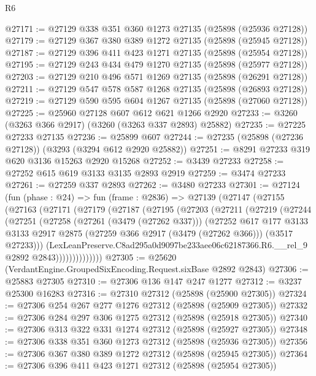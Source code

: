 \begin{lexlean}{R6}
\begin{coremodule}
@27171 := @27129 @338 @351 @360 @1273 @27135 (@25898 (@25936 @27128))
@27179 := @27129 @367 @380 @389 @1272 @27135 (@25898 (@25945 @27128))
@27187 := @27129 @396 @411 @423 @1271 @27135 (@25898 (@25954 @27128))
@27195 := @27129 @243 @434 @479 @1270 @27135 (@25898 (@25977 @27128))
@27203 := @27129 @210 @496 @571 @1269 @27135 (@25898 (@26291 @27128))
@27211 := @27129 @547 @578 @587 @1268 @27135 (@25898 (@26893 @27128))
@27219 := @27129 @590 @595 @604 @1267 @27135 (@25898 (@27060 @27128))
@27225 := @25960 @27128 @607 @612 @621 @1266 @2920
@27233 := @3260 (@3263 @366 @2917) (@3260 (@3263 @337 @2893) @25882)
@27235 := @27225 @27233 @27135
@27236 := @25899 @607
@27244 := @27235 (@25898 (@27236 @27128)) (@3293 (@3294 @612 @2920 @25882))
@27251 := @8291 @27233 @319 @620 @3136 @15263 @2920 @15268
@27252 := @3439 @27233
@27258 := @27252 @615 @619 @3133 @3135 @2893 @2919
@27259 := @3474 @27233
@27261 := @27259 @337 @2893
@27262 := @3480 @27233
@27301 := @27124
    (fun (phase : @24) =>
    fun (frame : @2836) =>
    @27139
      (@27147
        (@27155
          (@27163
            (@27171
              (@27179
                (@27187
                  (@27195
                    (@27203
                      (@27211
                        (@27219
                          (@27244
                            (@27251
                              (@27258
                                (@27261 (@3479 (@27262 @337)))
                                (@27252
                                  @617
                                  @177
                                  @3133
                                  @3133
                                  @2917
                                  @2875
                                  (@27259 @366 @2917 (@3479 (@27262 @366)))
                                  (@3517 @27233)))
                              (LexLeanPreserve.C8ad295a0d9097be233aee06c62187366.R6.__rel_9
                                @2892
                                @2843))))))))))))))
@27305 := @25620 (VerdantEngine.GroupedSixEncoding.Request.sixBase @2892 @2843)
@27306 := @25883 @27305
@27310 := @27306 @136 @147 @247 @1277
@27312 := @3237 @25300 @16283
@27316 := @27310 @27312 (@25898 (@25900 @27305))
@27324 := @27306 @254 @267 @277 @1276 @27312 (@25898 (@25909 @27305))
@27332 := @27306 @284 @297 @306 @1275 @27312 (@25898 (@25918 @27305))
@27340 := @27306 @313 @322 @331 @1274 @27312 (@25898 (@25927 @27305))
@27348 := @27306 @338 @351 @360 @1273 @27312 (@25898 (@25936 @27305))
@27356 := @27306 @367 @380 @389 @1272 @27312 (@25898 (@25945 @27305))
@27364 := @27306 @396 @411 @423 @1271 @27312 (@25898 (@25954 @27305))

\end{coremodule}
\end{lexlean}
